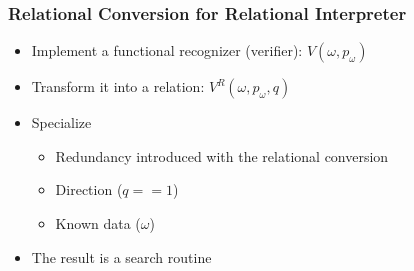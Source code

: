 \documentclass[xcolor=table]{beamer}
\begin{document}
\begin{frame}[fragile]
  \transwipe[direction=90]
  \frametitle{Relational Conversion for Relational Interpreter}
\begin{itemize}
  \item Implement a functional recognizer (verifier): $V(\omega, p_{\omega})$
  \item Transform it into a relation: $V^R(\omega, p_{\omega}, q)$
  \item Specialize
  \begin{itemize}
    \item Redundancy introduced with the relational conversion
    \item Direction ($q == 1$)
    \item Known data ($\omega$)
  \end{itemize}
  \item The result is a search routine
\end{itemize}
\end{frame}

\end{document}
